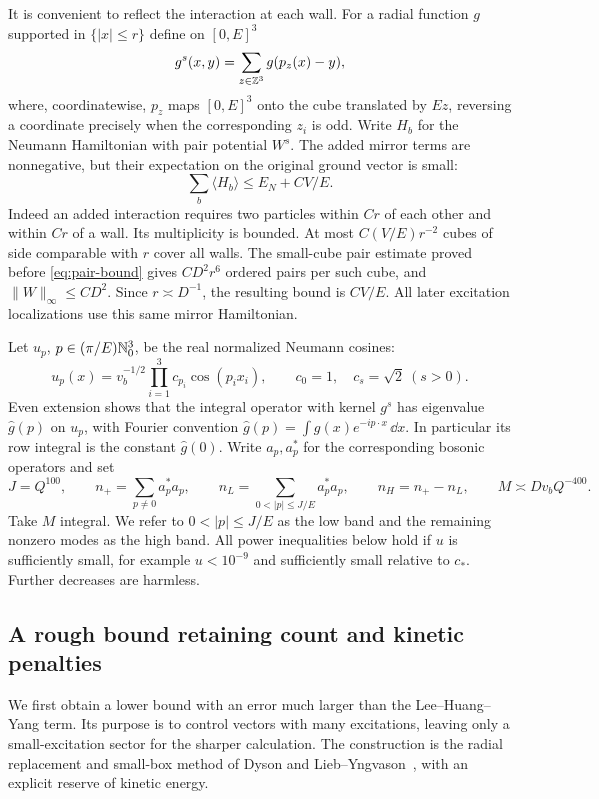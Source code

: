 It is convenient to reflect the interaction at each wall.  For a radial
function $g$ supported in $\{|x|\le r\}$ define on $[0,E]^3$
\[
 g^s(x,y)=\sum_{z\in\mathbb Z^3}g(p_z(x)-y),
\]
where, coordinatewise, $p_z$ maps $[0,E]^3$ onto the cube translated by
$Ez$, reversing a coordinate precisely when the corresponding $z_i$ is
odd.  Write $H_b$ for the Neumann Hamiltonian with pair potential $W^s$.
The added mirror terms are nonnegative, but their expectation on the
original ground vector is small:
\begin{equation}\label{eq:energy-mirror-error}
 \sum_b\langle H_b\rangle\le E_N+CV/E.
\end{equation}
Indeed an added interaction requires two particles within $Cr$ of each
other and within $Cr$ of a wall.  Its multiplicity is bounded.  At most
$C(V/E)r^{-2}$ cubes of side comparable with $r$ cover all walls.  The
small-cube pair estimate proved before \eqref{eq:pair-bound} gives
$CD^2r^6$ ordered pairs per such cube, and $\|W\|_\infty\le CD^2$.
Since $r\asymp D^{-1}$, the resulting bound is $CV/E$.
All later excitation localizations use this same mirror Hamiltonian.

Let $u_p$, $p\in(\pi/E)\mathbb N_0^3$, be the real normalized Neumann cosines:
\[
 u_p(x)=v_b^{-1/2}\prod_{i=1}^3c_{p_i}\cos(p_ix_i),\qquad
 c_0=1,\quad c_s=\sqrt2\ (s>0).
\]
Even extension shows that the integral operator with kernel $g^s$ has
eigenvalue $\widehat g(p)$ on $u_p$, with Fourier convention
$\widehat g(p)=\int g(x)e^{-ip\cdot x}\,\dd x$.  In particular its row
integral is the constant $\widehat g(0)$.
Write $a_p,a_p^*$ for the corresponding bosonic operators and set
\begin{equation}\label{eq:energy-bands}
 J=Q^{100},\qquad
 n_+=\sum_{p\ne0}a_p^*a_p,\qquad
 n_L=\sum_{0<|p|\le J/E}a_p^*a_p,\qquad
 n_H=n_+-n_L,\qquad M\asymp Dv_bQ^{-400}.
\end{equation}
Take $M$ integral.  We refer to $0<|p|\le J/E$ as the low band and the
remaining nonzero modes as the high band.  All power inequalities below
hold if $u$ is sufficiently small, for example $u<10^{-9}$ and
sufficiently small relative to $c_*$.  Further decreases are harmless.

\subsection{A rough bound retaining count and kinetic penalties}

We first obtain a lower bound with an error much larger than the
Lee--Huang--Yang term.  Its purpose is to control vectors with many
excitations, leaving only a small-excitation sector for the sharper
calculation.  The construction is the radial replacement and small-box
method of Dyson and Lieb--Yngvason~\cite{Dyson,LiebYngvason}, with an
explicit reserve of kinetic energy.

